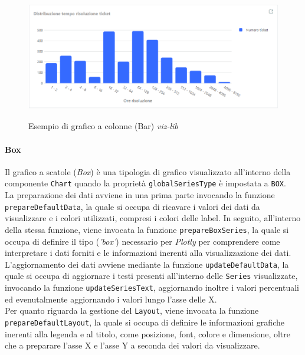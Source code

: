 \begin{figure}[H]
    \centering
    \includegraphics[alt={Esempio di grafico a colonne viz-lib}, width=1 \columnwidth, height=\maxdimen, keepaspectratio]{img/ex_bar.png}
    \caption{Esempio di grafico a colonne (Bar) \textit{viz-lib}}
    \label{fig:bar-example}
\end{figure}

\paragraph{Box}
Il grafico a scatole (\textit{Box}) è una tipologia di grafico visualizzato all'interno della componente \texttt{Chart} quando la proprietà \texttt{globalSeriesType} è impostata a \texttt{BOX}. \\
La preparazione dei dati avviene in una prima parte invocando la funzione \texttt{prepareDefaultData}, la quale si occupa di ricavare i valori dei dati da visualizzare e i colori utilizzati, compresi i
colori delle label. In seguito, all'interno della stessa funzione, viene invocata la funzione \texttt{prepareBoxSeries}, la quale si occupa di definire il tipo (\textit{'box'}) necessario per \textit{Plotly} per comprendere
come interpretare i dati forniti e le informazioni inerenti alla visualizzazione dei dati. \\
L'aggiornamento dei dati avviene mediante la funzione \texttt{updateDefaultData}, la quale si occupa di aggiornare i testi presenti all'interno delle \texttt{Series} visualizzate, invocando la funzione
\texttt{updateSeriesText}, aggiornando inoltre i valori percentuali ed evenutalmente aggiornando i valori lungo l'asse delle X. \\
Per quanto riguarda la gestione del \texttt{Layout}, viene invocata la funzione \texttt{prepareDefaultLayout}, la quale si occupa di definire le informazioni grafiche inerenti alla legenda e al titolo, come posizione,
font, colore e dimensione, oltre che a preparare l'asse X e l'asse Y a seconda dei valori da visualizzare.

